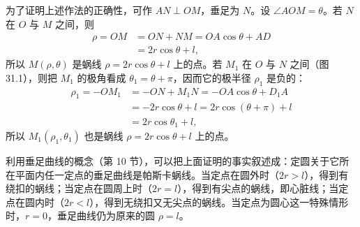 \medskip

为了证明上述作法的正确性，可作 $AN\perp OM$，垂足为 $N$。设 $\angle AOM=\theta$。若 $N$ 在 $O$ 与 $M$ 之间，则
\begin{align*}
  \rho = OM &= ON + NM = OA\cos\theta + AD \\
            &= 2r\cos\theta + l,
\end{align*}
所以 $M(\rho,\theta)$ 是蜗线 $\rho=2r\cos\theta+l$ 上的点。若 $M_1$ 在 $O$ 与 $N$ 之间（图 31.1），则把 $M_1$ 的极角看成 $\theta_1=\theta+\pi$，因而它的极半径 $\rho_1$ 是负的：
\begin{align*}
  \rho_1 = -OM_1 &= -ON + M_1N = -OA\cos\theta + D_1A \\
                 &= -2r\cos\theta + l = 2r\cos(\theta+\pi) + l \\
                 &= 2r\cos\theta_1 + l,
\end{align*}
所以 $M_1(\rho_1,\theta_1)$ 也是蜗线 $\rho=2r\cos\theta+l$ 上的点。

利用垂足曲线的概念（第 10 节），可以把上面证明的事实叙述成：定圆关于它所在平面内任一定点的垂足曲线是帕斯卡蜗线。当定点在圆外时（$2r>l$），得到有绕扣的蜗线；当定点在圆周上时（$2r=l$），得到有尖点的蜗线，即心脏线；当定点在圆内时（$2r<l$），得到无绕扣又无尖点的蜗线。当定点为圆心这一特殊情形时，$r=0$，垂足曲线仍为原来的圆 $\rho=l$。
